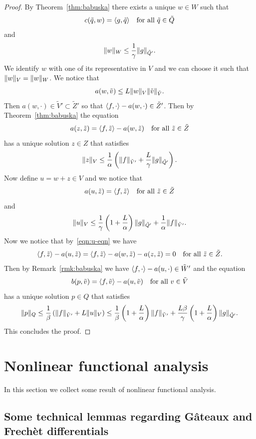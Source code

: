 \documentclass[a4paper,10pt,twoside]{amsbook}
\numberwithin{section}{chapter}
\numberwithin{equation}{chapter}
\theoremstyle{definition}
\DeclarePairedDelimiter{\norm}{\lVert}{\rVert}
\DeclarePairedDelimiter{\dual}{\langle}{\rangle}
\begin{document}
\begin{proof}
By Theorem~\ref{thm:babuska} there exists a unique $w\in W$ such that
\[
c(\tilde q,w)=\dual{g,\tilde q}\quad\text{for all $\tilde q\in\tilde Q$}
\]
and
\[
\norm{w}_W\le\frac{1}{\gamma}\norm{g}_{\tilde Q'}.
\]
We identify $w$ with one of its representative in $V$ and we can choose it such that $\norm{w}_V=\norm{w}_W$. We notice that
\[
a(w,\tilde v)\le L\norm{w}_V\norm{\tilde v}_{\tilde V}.
\]
Then $a(w,\cdot)\in\tilde V'\subset\tilde Z'$ so that $\dual{f,\cdot}-a(w,\cdot)\in\tilde Z'$. Then by Theorem~\ref{thm:babuska} the equation
\[
a(z,\tilde z)=\dual{f,\tilde z}-a(w,\tilde z)\quad\text{for all $\tilde z\in\tilde Z$}
\]
has a unique solution $z\in Z$ that satisfies
\[
\norm{z}_V\le\frac{1}{\alpha}\left(\norm{f}_{\tilde V'}+\frac{L}{\gamma}\norm{g}_{\tilde Q'}\right).
\]
Now define $u=w+z\in V$ and we notice that
\begin{equation}
\label{eqn:u-eqn}
a(u,\tilde z)=\dual{f,\tilde z}\quad\text{for all $\tilde z\in\tilde Z$}
\end{equation}
and
\[
\norm{u}_V\le\frac{1}{\gamma}\left(1+\frac{L}{\alpha}\right)\norm{g}_{\tilde Q'}+\frac{1}{\alpha}\norm{f}_{\tilde V'}.
\]
Now we notice that by~\eqref{eqn:u-eqn} we have
\[
\dual{f,\tilde z}-a(u,\tilde z)=\dual{f,\tilde z}-a(w,\tilde z)-a(z,\tilde z)=0\quad\text{for all $\tilde z\in\tilde Z$}.
\]
Then by Remark~\ref{rmk:babuska} we have $\dual{f,\cdot}-a(u,\cdot)\in\tilde{W}'$ and the equation
\[
b(p,\tilde v)=\dual{f,\tilde v}-a(u,\tilde v)\quad\text{for all $v\in\tilde V$}
\]
has a unique solution $p\in Q$ that satisfies
\[
\norm{p}_Q\le\frac{1}{\beta}\left(\norm{f}_{\tilde V'}+L\norm{u}_V\right)\le\frac{1}{\beta}\left(1+\frac{L}{\alpha}\right)\norm{f}_{\tilde V'}+\frac{L\beta}{\gamma}\left(1+\frac{L}{\alpha}\right)\norm{g}_{\tilde Q'}.
\]
This concludes the proof.
\end{proof}

\section{Nonlinear functional analysis}

In this section we collect some result of nonlinear functional analysis.

\subsection{Some technical lemmas regarding G\^ateaux and Frechèt differentials}
\end{document}
